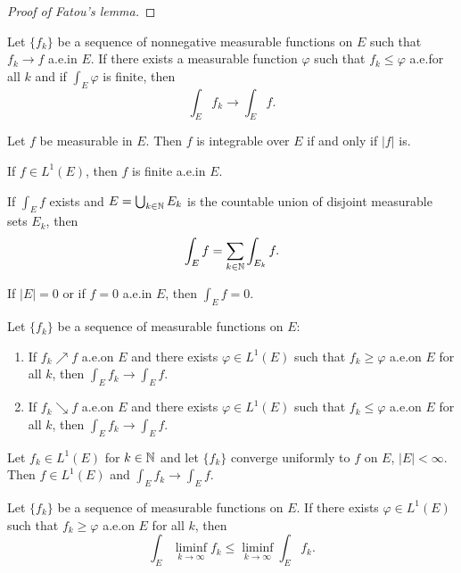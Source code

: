\begin{proof}[Proof of Fatou's lemma]
\end{proof}
\begin{theorem*}
Let $\{f_k\}$ be a sequence of nonnegative measurable functions on $E$ such
that $f_k\to f$ a.e.\@ in $E$. If there exists a measurable function
$\varphi$ such that $f_k\leq\varphi$ a.e.\@ for all $k$ and if
$\int_E\varphi$ is finite, then
\[
\int_E f_k\longrightarrow\int_E f.
\]
\end{theorem*}
\begin{theorem*}[5.21]
Let $f$ be measurable in $E$. Then $f$ is integrable over $E$ if and only
if $|f|$ is.
\end{theorem*}
\begin{theorem*}[5.22]
If $f\in L^1(E)$, then $f$ is finite a.e.\@ in $E$.
\end{theorem*}
\begin{theorem*}[5.24]
If $\int_E f$ exists and $E=\bigcup_{k\in\mathbb{N}} E_k$ is the countable union
of disjoint measurable sets $E_k$, then
\[
\int_E f=\sum_{k\in\mathbb{N}}\int_{E_k}f.
\]
\end{theorem*}
\begin{theorem*}[5.25]
If $|E|=0$ or if $f=0$ a.e.\@ in $E$, then $\int_E f=0$.
\end{theorem*}
\begin{theorem*}
Let $\{f_k\}$ be a sequence of measurable functions on $E$:
\begin{enumerate}[label=\textnormal{(\roman*)}]
\item If $f_k\nearrow f$ a.e.\@ on $E$ and there exists $\varphi\in L^1(E)$ such
  that $f_k\geq\varphi$ a.e.\@ on $E$ for all $k$, then $\int_E
  f_k\to\int_E f$.
\item If $f_k\searrow f$ a.e.\@ on $E$ and there exists $\varphi\in L^1(E)$ such
  that $f_k\leq\varphi$ a.e.\@ on $E$ for all $k$, then $\int_E
  f_k\to\int_E f$.
\end{enumerate}
\end{theorem*}
\begin{theorem*}
Let $f_k\in L^1(E)$ for $k\in\mathbb{N}$ and let $\{f_k\}$ converge uniformly to
$f$ on $E$, $|E|<\infty$. Then $f\in L^1(E)$ and $\int_E f_k\to\int_E f$.
\end{theorem*}
\begin{theorem*}
Let $\{f_k\}$ be a sequence of measurable functions on $E$. If there exists
$\varphi\in L^1(E)$ such that $f_k\geq\varphi$ a.e.\@ on $E$ for all $k$,
then
\[
\int_E\liminf_{k\to\infty} f_k\leq\liminf_{k\to\infty}\int_E f_k.
\]
\end{theorem*}

